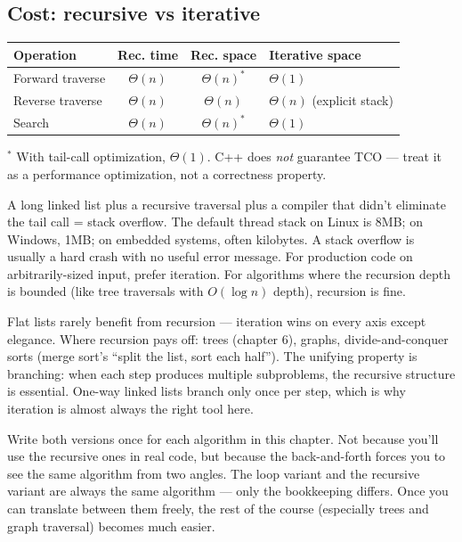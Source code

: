 \documentclass[11pt]{article}
\begin{document}
\subsection*{Cost: recursive vs iterative}

\begin{center}
\begin{tabular}{|l|c|c|l|}
\hline
\textbf{Operation} & \textbf{Rec. time} & \textbf{Rec. space} & \textbf{Iterative space} \\
\hline
Forward traverse  & $\Theta(n)$ & $\Theta(n)^*$ & $\Theta(1)$ \\
Reverse traverse  & $\Theta(n)$ & $\Theta(n)$   & $\Theta(n)$ (explicit stack) \\
Search            & $\Theta(n)$ & $\Theta(n)^*$ & $\Theta(1)$ \\
\hline
\end{tabular}
\end{center}

\noindent$^*$ With tail-call optimization, $\Theta(1)$. C++ does
\emph{not} guarantee TCO --- treat it as a performance
optimization, not a correctness property.

\begin{warnbox}
A long linked list plus a recursive traversal plus a compiler
that didn't eliminate the tail call = stack overflow. The default
thread stack on Linux is 8MB; on Windows, 1MB; on embedded
systems, often kilobytes. A stack overflow is usually a hard
crash with no useful error message. For production code on
arbitrarily-sized input, prefer iteration. For algorithms where
the recursion depth is bounded (like tree traversals with
$O(\log n)$ depth), recursion is fine.
\end{warnbox}

\begin{notebox}
Flat lists rarely benefit from recursion --- iteration wins on
every axis except elegance. Where recursion pays off: trees
(chapter 6), graphs, divide-and-conquer sorts (merge sort's
``split the list, sort each half''). The unifying property is
branching: when each step produces multiple subproblems, the
recursive structure is essential. One-way linked lists branch
only once per step, which is why iteration is almost always the
right tool here.
\end{notebox}

\begin{ideabox}
Write both versions once for each algorithm in this chapter.
Not because you'll use the recursive ones in real code, but
because the back-and-forth forces you to see the same algorithm
from two angles. The loop variant and the recursive variant are
always the same algorithm --- only the bookkeeping differs.
Once you can translate between them freely, the rest of the
course (especially trees and graph traversal) becomes much
easier.
\end{ideabox}
\end{document}
